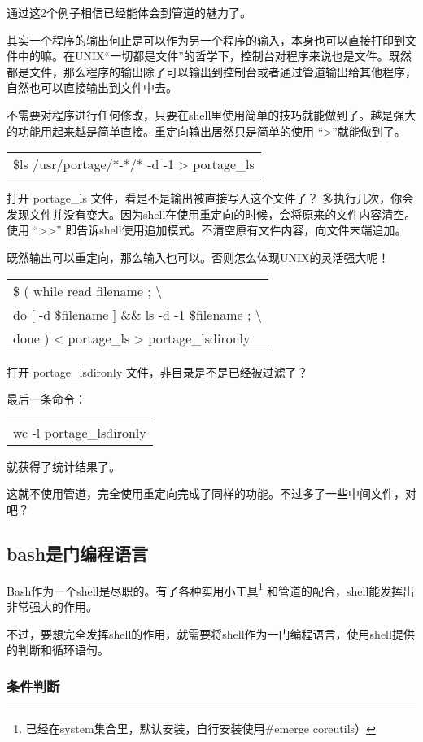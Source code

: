 \documentclass[amstex,twoside]{ctexbook}
\newenvironment{code}{\small\tt\begin{longtable}{p{0.8\textwidth}}}{\end{longtable}}
\begin{document}
通过这2个例子相信已经能体会到管道的魅力了。

其实一个程序的输出何止是可以作为另一个程序的输入，本身也可以直接打印到文件中的嘛。在UNIX“一切都是文件”的哲学下，控制台对程序来说也是文件。既然都是文件，那么程序的输出除了可以输出到控制台或者通过管道输出给其他程序，自然也可以直接输出到文件中去。

不需要对程序进行任何修改，只要在shell里使用简单的技巧就能做到了。越是强大的功能用起来越是简单直接。重定向输出居然只是简单的使用 “>”就能做到了。

\begin{code}
\$ls /usr/portage/*-*/* -d -1 > portage\_ls
\end{code}

打开 portage\_ls 文件，看是不是输出被直接写入这个文件了？
多执行几次，你会发现文件并没有变大。因为shell在使用重定向的时候，会将原来的文件内容清空。使用 “>>” 即告诉shell使用追加模式。不清空原有文件内容，向文件末端追加。

既然输出可以重定向，那么输入也可以。否则怎么体现UNIX的灵活强大呢！

\begin{code}
\$ ( while read filename ; \textbackslash \\
	\qquad do [ -d \$filename ] \&\&  ls -d -1 \$filename  ; \textbackslash \\
	\qquad done ) <  portage\_ls > portage\_lsdironly
\end{code}

打开 portage\_lsdironly 文件，非目录是不是已经被过滤了？

最后一条命令：

\begin{code}
wc -l portage\_lsdironly
\end{code}

就获得了统计结果了。

这就不使用管道，完全使用重定向完成了同样的功能。不过多了一些中间文件，对吧？


\subsection{bash是门编程语言}

Bash作为一个shell是尽职的。有了各种实用小工具\footnote{已经在system集合里，默认安装，自行安装使用\#emerge coreutils）} 和管道的配合，shell能发挥出非常强大的作用。

不过，要想完全发挥shell的作用，就需要将shell作为一门编程语言，使用shell提供的判断和循环语句。

\subsubsection{条件判断}
\end{document}
